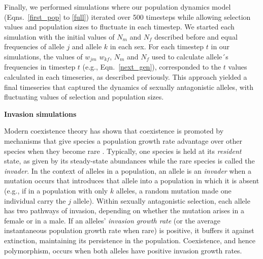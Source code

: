 \documentclass[12pt]{article}
\begin{document}


Finally, we performed simulations where our population dynamics model (Eqns.~\ref{first_pop} to \ref{full}) iterated over 500 timesteps while allowing selection values and population sizes to fluctuate in each timestep. We started each simulation with the initial values of $N_{m}$ and $N_{f}$ described before and equal frequencies of allele $j$ and allele $k$ in each sex. For each timestep $t$ in our simulations, the values of $w_{jm}$ $w_{kf}$, $N_{m}$ and $N_{f}$ used to calculate allele´s frequencies in timestep $t$ (e.g., Eqn.~\ref{next_gen}), corresponded to the $t$ values calculated in each timeseries, as described previously. This approach yielded a final timeseries that captured the dynamics of sexually antagonistic alleles, with fluctuating values of selection and population sizes.

\vspace{5mm}
\noindent\textbf{Invasion simulations}

 Modern coexistence theory has shown that coexistence is promoted by mechanisms that give species a population growth rate advantage over other species when they become rare \citep{chesson_stabilizing_1982, chesson2003quantifying, barabas_chessons_2018}. Typically, one species is held at its \textit{resident} state, as given by its steady-state abundances while the rare species is called the \textit{invader}. In the context of alleles in a population, an allele is an \textit{invader} when a mutation occurs that introduces that allele into a population in which it is absent (e.g., if in a population with only $k$ alleles, a random mutation made one individual carry the $j$ allele). Within sexually antagonistic selection, each allele has two pathways of invasion, depending on whether the mutation arises in a female or in a male. If an alleles' \textit{invasion growth rate} (or the average instantaneous population growth rate when rare) is positive, it buffers it against extinction, maintaining its persistence in the population.  Coexistence, and hence polymorphism, occurs when both alleles have positive invasion growth rates.
\end{document}
